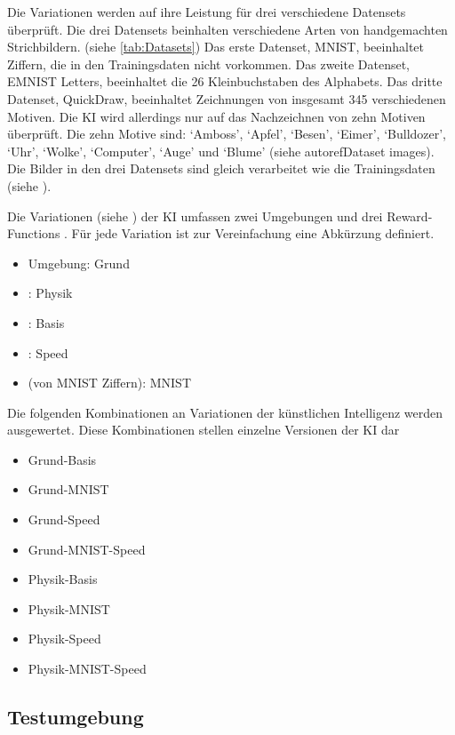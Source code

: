 Die Variationen werden auf ihre Leistung für drei verschiedene Datensets
überprüft. Die drei Datensets beinhalten verschiedene Arten von handgemachten
Strichbildern. (siehe \autoref{tab:Datasets}) Das erste Datenset, MNIST,
beeinhaltet Ziffern, die in den Trainingsdaten nicht vorkommen. Das zweite
Datenset, EMNIST Letters, beeinhaltet die 26 Kleinbuchstaben des Alphabets. Das
dritte Datenset, QuickDraw, beeinhaltet Zeichnungen von insgesamt 345
verschiedenen Motiven. Die KI wird allerdings nur auf das Nachzeichnen von zehn
Motiven überprüft. Die zehn Motive sind: `Amboss', `Apfel', `Besen', `Eimer',
`Bulldozer', `Uhr', `Wolke', `Computer', `Auge' und `Blume' (siehe
autoref{Dataset images}). Die Bilder in den
drei Datensets sind gleich verarbeitet wie die Trainingsdaten (siehe
). 


Die Variationen (siehe ) der KI umfassen zwei Umgebungen und
drei Reward-Functions . Für jede Variation ist zur
Vereinfachung eine Abkürzung definiert.
\begin{itemize}
  \item {} Umgebung: Grund
  \item {}: Physik
  \item {}: Basis
  \item {}: Speed
  \item {} (von MNIST Ziffern): MNIST
\end{itemize}

Die folgenden Kombinationen an Variationen der künstlichen Intelligenz werden
ausgewertet. Diese Kombinationen stellen einzelne Versionen der KI dar
\begin{itemize}
  \item Grund-Basis
  \item Grund-MNIST
  \item Grund-Speed
  \item Grund-MNIST-Speed 
  \item Physik-Basis
  \item Physik-MNIST
  \item Physik-Speed
  \item Physik-MNIST-Speed
\end{itemize}

\subsection{Testumgebung}\label{sub:m_auswert_test}


